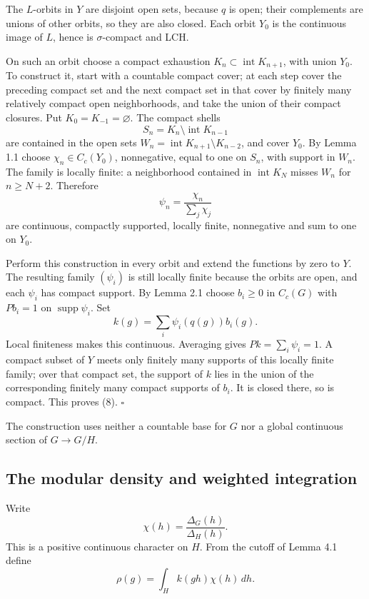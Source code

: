\documentclass[
  english,
  11pt,
  a4paper,
]{article}
\begin{document}
The \(L\)-orbits in \(Y\) are disjoint open sets, because \(q\) is open;
their complements are unions of other orbits, so they are also closed.
Each orbit \(Y_0\) is the continuous image of \(L\), hence is
\(\sigma\)-compact and LCH.

On such an orbit choose a compact exhaustion
\(K_n\subset\operatorname{int}K_{n+1}\), with union \(Y_0\). To
construct it, start with a countable compact cover; at each step cover
the preceding compact set and the next compact set in that cover by
finitely many relatively compact open neighborhoods, and take the union
of their compact closures. Put \(K_0=K_{-1}=\varnothing\). The compact
shells \[S_n=K_n\setminus\operatorname{int}K_{n-1}\] are contained in
the open sets \(W_n=\operatorname{int}K_{n+1}\setminus K_{n-2}\), and
cover \(Y_0\). By Lemma 1.1 choose \(\chi_n\in C_c(Y_0)\), nonnegative,
equal to one on \(S_n\), with support in \(W_n\). The family is locally
finite: a neighborhood contained in \(\operatorname{int}K_N\) misses
\(W_n\) for \(n\geq N+2\). Therefore
\[\psi_n=\frac{\chi_n}{\sum_j\chi_j}\] are continuous, compactly
supported, locally finite, nonnegative and sum to one on \(Y_0\).

Perform this construction in every orbit and extend the functions by
zero to \(Y\). The resulting family \((\psi_i)\) is still locally finite
because the orbits are open, and each \(\psi_i\) has compact support. By
Lemma 2.1 choose \(b_i\geq0\) in \(C_c(G)\) with \(Pb_i=1\) on
\(\operatorname{supp}\psi_i\). Set \[k(g)=\sum_i \psi_i(q(g))b_i(g).
\tag{9}\] Local finiteness makes this continuous. Averaging gives
\(Pk=\sum_i\psi_i=1\). A compact subset of \(Y\) meets only finitely
many supports of this locally finite family; over that compact set, the
support of \(k\) lies in the union of the corresponding finitely many
compact supports of \(b_i\). It is closed there, so is compact. This
proves (8). \(\square\)

The construction uses neither a countable base for \(G\) nor a global
continuous section of \(G\to G/H\).

\subsection{The modular density and weighted
integration}\label{quotient-measures-and-weils-integration-formula--the-modular-density-and-weighted-integration}

Write \[\chi(h)=\frac{\Delta_G(h)}{\Delta_H(h)}.\] This is a positive
continuous character on \(H\). From the cutoff of Lemma 4.1 define
\[\rho(g)=\int_H k(gh)\chi(h)\,dh.
\tag{10}\]
\end{document}
